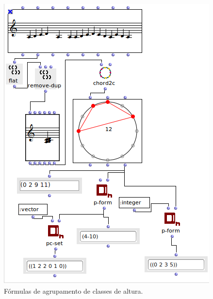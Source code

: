 \documentclass[
	12pt,				%
	openright,			%
	twoside,			%
	a4paper,			%
	english,			%
	french,				%
	spanish,			%
	brazil				%
	]{abntex2}
\begin{document}
\begin{figure}[h]
	\caption{\label{fig_grafico}Fórmulas de agrupamento de classes de altura. }
	\begin{center}
	    \includegraphics[scale=0.7]{OM_settheory/forma_prima_forte_vector.png}
	\end{center}
\end{figure}
\end{document}
